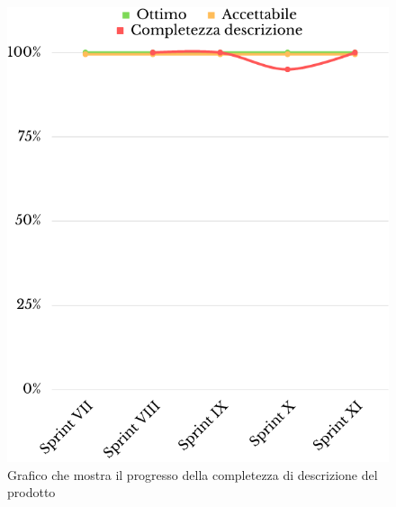 \begin{figure}[H]
	\centering
	\includegraphics[scale=0.35]{img/completezza_descrizione.png}
	\caption{Grafico che mostra il progresso della completezza di descrizione del prodotto}
\end{figure}
